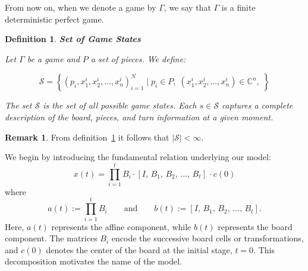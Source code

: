 \documentclass[11pt,a4paper]{article}
\theoremstyle{plain}
\newtheorem{definition}{Definition}[section]
\theoremstyle{definition}
\newtheorem{remark}{Remark}[section]
\begin{document}
From now on, when we denote a game by $\Gamma$, we say that $\Gamma$ is a finite deterministic perfect game.

\vspace{0.5em}

\begin{definition}\textbf{Set of Game States}

\vspace{0.5em}

Let $\Gamma$ be a game and $P$ a set of pieces. We define:

\vspace{0.5em}

\begin{equation}
\mathcal{S} = \left\{ \left( p_i, x^i_1, x^i_2, \ldots, x^i_n \right)_{i=1}^{N} \;|\; p_i \in P,\; \left(x^i_1, x^i_2, \ldots, x^i_n \right) \in \mathbb{C}^n,\; \right\}
\label{eq:Set-of-Game-States}
\end{equation}

\vspace{0.5em}

The set $\mathcal{S}$ is the set of all possible game states. Each $s \in \mathcal{S}$ captures a complete description of the board, pieces, and turn information at a given moment.

\vspace{0.5em}

\label{def:Set-of-Game-States}
\end{definition}

\vspace{0.5em}

\begin{remark}
From definition~\ref{def:Set-of-Game-States} it follows that $|\mathcal{S}| < \infty$.
\end{remark}

We begin by introducing the fundamental relation underlying our model:
\begin{equation}
    x(t)
    =
    \prod_{i=1}^{t} B_i \cdot
    [I,\,B_1,\,B_2,\,\ldots,\,B_t]\, \cdot c(0)
    \label{eq:Vector_Sequences_condensed}
\end{equation}
where
\[
    a(t) := \prod_{i=1}^{t} B_i
    \qquad\text{and}\qquad
    b(t) := [I,\,B_1,\,B_2,\,\ldots,\,B_t].
\]
Here, $a(t)$ represents the affine component, while $b(t)$ represents the board component. The matrices $B_i$ encode the successive board cells or transformations, and $c(0)$ denotes the center of the board at the initial stage, $t=0$. This decomposition motivates the name of the model.
\end{document}
